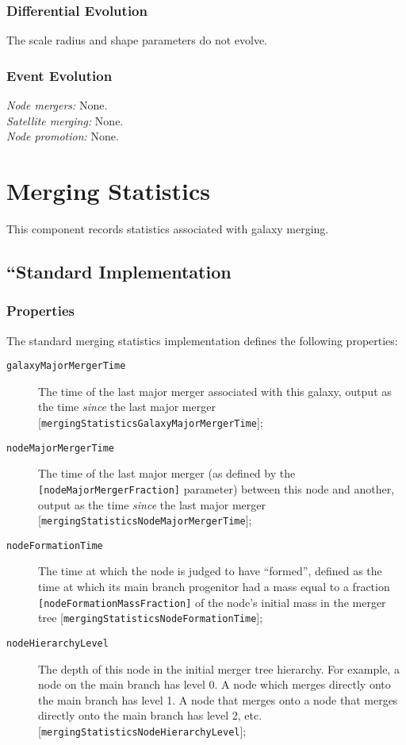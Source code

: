 \subsubsection{Differential Evolution}

The scale radius and shape parameters do not evolve.

\subsubsection{Event Evolution}

\noindent\emph{Node mergers:} None.\\

\noindent\emph{Satellite merging:} None.\\

\noindent\emph{Node promotion:} None.\\


\section{Merging Statistics}

This \gls{component} records statistics associated with galaxy merging.

\subsection{``Standard Implementation}

\subsubsection{Properties}

The standard merging statistics implementation defines the following properties:
\begin{description}
 \item [{\tt galaxyMajorMergerTime}] The time of the last major merger associated with this galaxy, output as the time \emph{since} the last major merger [{\tt mergingStatisticsGalaxyMajorMergerTime}];
 \item [{\tt nodeMajorMergerTime}] The time of the last major merger (as defined by the {\tt [nodeMajorMergerFraction]} parameter) between this \gls{node} and another, output as the time \emph{since} the last major merger [{\tt mergingStatisticsNodeMajorMergerTime}];
 \item [{\tt nodeFormationTime}] The time at which the \gls{node} is judged to have ``formed'', defined as the time at which its main branch progenitor had a mass equal to a fraction {\tt [nodeFormationMassFraction]} of the node's initial mass in the merger tree [{\tt mergingStatisticsNodeFormationTime}];
 \item [{\tt nodeHierarchyLevel}] The depth of this node in the initial merger tree hierarchy. For example, a node on the main branch has level 0. A node which merges directly onto the main branch has level 1. A node that merges onto a node that merges directly onto the main branch has level 2, etc. [{\tt mergingStatisticsNodeHierarchyLevel}];
\end{description}

